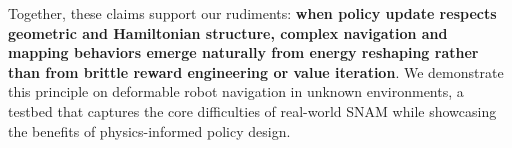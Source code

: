 Together, these claims support our rudiments: \textbf{when policy update respects geometric and Hamiltonian structure, complex navigation and mapping behaviors emerge naturally from energy reshaping rather than from brittle reward engineering or value iteration}. We demonstrate this principle on deformable robot navigation in unknown environments, a testbed that captures the core difficulties of real-world SNAM while showcasing the benefits of physics-informed policy design.



